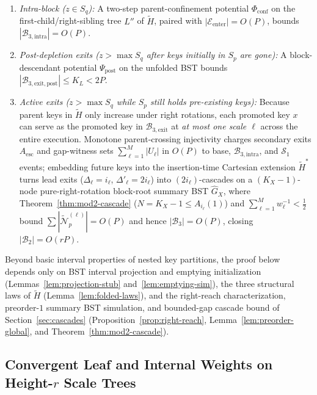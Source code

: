 \documentclass[11pt]{article}
\theoremstyle{definition}
\theoremstyle{remark}
\begin{document}
\begin{itemize}[leftmargin=2em]
\begin{enumerate}[label=(\roman*)]
      \item \emph{Intra-block ($z \in S_q$):} A two-step parent-confinement potential $\Phi_{\mathrm{conf}}$ on the first-child/right-sibling tree $L''$ of $\widetilde{H}$, paired with $|\mathcal{E}_{\mathrm{enter}}| = O(P)$, bounds $|\mathcal{B}_{3,\mathrm{intra}}| = O(P)$.
      \item \emph{Post-depletion exits ($z > \max S_q$ after keys initially in $S_p$ are gone):} A block-descendant potential $\Psi_{\mathrm{post}}$ on the unfolded BST bounds $|\mathcal{B}_{3,\mathrm{exit, post}}| \le K_L < 2P$.
      \item \emph{Active exits ($z > \max S_q$ while $S_p$ still holds pre-existing keys):} Because parent keys in $\widetilde{H}$ only increase under right rotations, each promoted key $x$ can serve as the promoted key in $\mathcal{B}_{3,\mathrm{exit}}$ at \emph{at most one scale $\ell$} across the entire execution. Monotone parent-crossing injectivity charges secondary exits $A_{\mathrm{esc}}$ and gap-witness sets $\sum_{\ell=1}^M |U_\ell|$ in $O(P)$ to base, $\mathcal{B}_{3,\mathrm{intra}}$, and $\mathcal{S}_1$ events; embedding future keys into the insertion-time Cartesian extension $\widetilde{H}^*$ turns lead exits ($\Delta_\ell = i_\ell$, $\Delta'_\ell = 2 i_\ell$) into $(2 i_\ell)$-cascades on a $(K_X - 1)$-node pure-right-rotation block-root summary BST $\widehat{G}_X$, where Theorem~\ref{thm:mod2-cascade} ($N = K_X - 1 \le A_{i_\ell}(1)$) and $\sum_{\ell=1}^M w_\ell^{-1} < \frac{1}{2}$ bound $\sum |\widetilde{\mathcal{N}}_p^{(\ell)}| = O(P)$ and hence $|\mathcal{B}_3| = O(P)$, closing $|\mathcal{B}_2| = O(r P)$.
    \end{enumerate}
\end{itemize}

Beyond basic interval properties of nested key partitions, the proof below depends only on BST interval projection and emptying initialization (Lemmas~\ref{lem:projection-stub} and~\ref{lem:emptying-sim}), the three structural laws of $\widetilde{H}$ (Lemma~\ref{lem:folded-laws}), and the right-reach characterization, preorder-$1$ summary BST simulation, and bounded-gap cascade bound of Section~\ref{sec:cascades} (Proposition~\ref{prop:right-reach}, Lemma~\ref{lem:preorder-global}, and Theorem~\ref{thm:mod2-cascade}).

\subsection{Convergent Leaf and Internal Weights on Height-\texorpdfstring{$r$}{r} Scale Trees}
\label{subsec:tree-weights}
\end{document}
